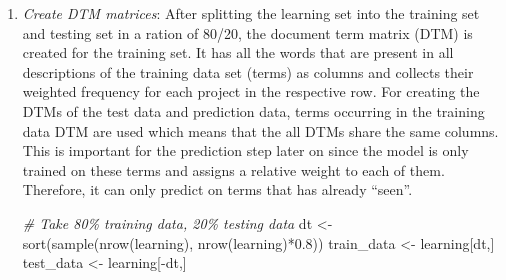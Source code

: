 \documentclass[
]{article}
\newenvironment{Shaded}{\begin{snugshade}}{\end{snugshade}}
\newcommand{\AttributeTok}[1]{\textcolor[rgb]{0.77,0.63,0.00}{#1}}
\newcommand{\CommentTok}[1]{\textcolor[rgb]{0.56,0.35,0.01}{\textit{#1}}}
\newcommand{\ControlFlowTok}[1]{\textcolor[rgb]{0.13,0.29,0.53}{\textbf{#1}}}
\newcommand{\FloatTok}[1]{\textcolor[rgb]{0.00,0.00,0.81}{#1}}
\newcommand{\FunctionTok}[1]{\textcolor[rgb]{0.00,0.00,0.00}{#1}}
\newcommand{\NormalTok}[1]{#1}
\newcommand{\OtherTok}[1]{\textcolor[rgb]{0.56,0.35,0.01}{#1}}
\newcommand{\SpecialCharTok}[1]{\textcolor[rgb]{0.00,0.00,0.00}{#1}}
\newcommand{\StringTok}[1]{\textcolor[rgb]{0.31,0.60,0.02}{#1}}
\begin{document}
\begin{enumerate}
\begin{enumerate}
\begin{Shaded}
\end{Shaded}
  \item
    \emph{Create DTM matrices}: After splitting the learning set into the training set and testing set in a ration of 80/20, the document term matrix (DTM) is created for the training set. It has all the words that are present in all descriptions of the training data set (terms) as columns and collects their weighted frequency for each project in the respective row. For creating the DTMs of the test data and prediction data, terms occurring in the training data DTM are used which means that the all DTMs share the same columns. This is important for the prediction step later on since the model is only trained on these terms and assigns a relative weight to each of them. Therefore, it can only predict on terms that has already ``seen''.

\begin{Shaded}
\begin{Highlighting}[]
\CommentTok{\# Take 80\% training data, 20\% testing data}
\NormalTok{dt }\OtherTok{\textless{}{-}} \FunctionTok{sort}\NormalTok{(}\FunctionTok{sample}\NormalTok{(}\FunctionTok{nrow}\NormalTok{(learning), }\FunctionTok{nrow}\NormalTok{(learning)}\SpecialCharTok{*}\FloatTok{0.8}\NormalTok{))}
\NormalTok{train\_data }\OtherTok{\textless{}{-}}\NormalTok{ learning[dt,]}
\NormalTok{test\_data }\OtherTok{\textless{}{-}}\NormalTok{ learning[}\SpecialCharTok{{-}}\NormalTok{dt,]}


\end{Highlighting}
\end{Shaded}
\end{enumerate}
\end{enumerate}
\end{document}
